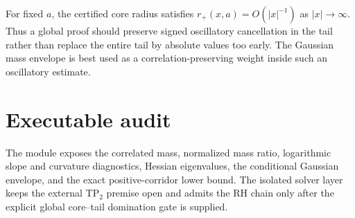 For fixed $a$, the certified core radius satisfies $r_+(x,a)=O(|x|^{-1})$ as $|x|\to\infty$.  Thus a global proof should preserve signed oscillatory cancellation in the tail rather than replace the entire tail by absolute values too early.  The Gaussian mass envelope is best used as a correlation-preserving weight inside such an oscillatory estimate.

\section{Executable audit}

The module  exposes the correlated mass, normalized mass ratio, logarithmic slope and curvature diagnostics, Hessian eigenvalues, the conditional Gaussian envelope, and the exact positive-corridor lower bound.  The isolated  solver layer keeps the external TP$_2$ premise open and admits the RH chain only after the explicit global core--tail domination gate is supplied.
